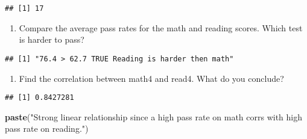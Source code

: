 \documentclass[]{article}
\newenvironment{Shaded}{\begin{snugshade}}{\end{snugshade}}
\newcommand{\KeywordTok}[1]{\textcolor[rgb]{0.13,0.29,0.53}{\textbf{#1}}}
\newcommand{\DataTypeTok}[1]{\textcolor[rgb]{0.13,0.29,0.53}{#1}}
\newcommand{\FloatTok}[1]{\textcolor[rgb]{0.00,0.00,0.81}{#1}}
\newcommand{\StringTok}[1]{\textcolor[rgb]{0.31,0.60,0.02}{#1}}
\newcommand{\OperatorTok}[1]{\textcolor[rgb]{0.81,0.36,0.00}{\textbf{#1}}}
\newcommand{\NormalTok}[1]{#1}
\providecommand{\tightlist}{%
  \setlength{\itemsep}{0pt}\setlength{\parskip}{0pt}}
\begin{document}
\begin{verbatim}
## [1] 17
\end{verbatim}

\begin{enumerate}
\def\labelenumi{\arabic{enumi}.}
\setcounter{enumi}{3}
\tightlist
\item
  Compare the average pass rates for the math and reading scores. Which
  test is harder to pass?
\end{enumerate}

\begin{Shaded}
\end{Shaded}

\begin{verbatim}
## [1] "76.4 > 62.7 TRUE Reading is harder then math"
\end{verbatim}

\begin{enumerate}
\def\labelenumi{\arabic{enumi}.}
\setcounter{enumi}{4}
\tightlist
\item
  Find the correlation between math4 and read4. What do you conclude?
\end{enumerate}

\begin{Shaded}
\end{Shaded}

\begin{verbatim}
## [1] 0.8427281
\end{verbatim}

\begin{Shaded}
\begin{Highlighting}[]
\KeywordTok{paste}\NormalTok{(}\StringTok{"Strong linear relationship since a high pass rate on math corrs with high pass rate on reading."}\NormalTok{)}
\end{Highlighting}
\end{Shaded}
\end{document}
